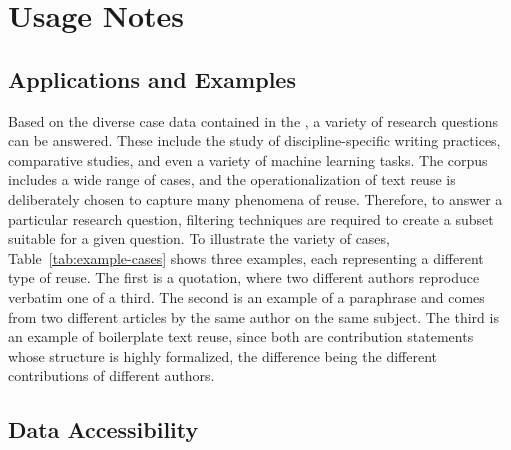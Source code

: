 \section*{Usage Notes}


\subsection*{Applications and Examples}

Based on the diverse case data contained in the \webisReuseCorpus, a variety of research questions can be answered. These include the study of discipline-specific writing practices, comparative studies, and even a variety of machine learning tasks. The corpus includes a wide range of cases, and the operationalization of text reuse is deliberately chosen to capture many phenomena of reuse. Therefore, to answer a particular research question, filtering techniques are required to create a subset suitable for a given question. To illustrate the variety of cases, Table~\ref{tab:example-cases} shows three examples, each representing a different type of reuse. The first is a quotation, where two different authors reproduce verbatim one of a third. The second is an example of a paraphrase and comes from two different articles by the same author on the same subject. The third is an example of boilerplate text reuse, since both are contribution statements whose structure is highly formalized, the difference being the different contributions of different authors.

\subsection*{Data Accessibility}

